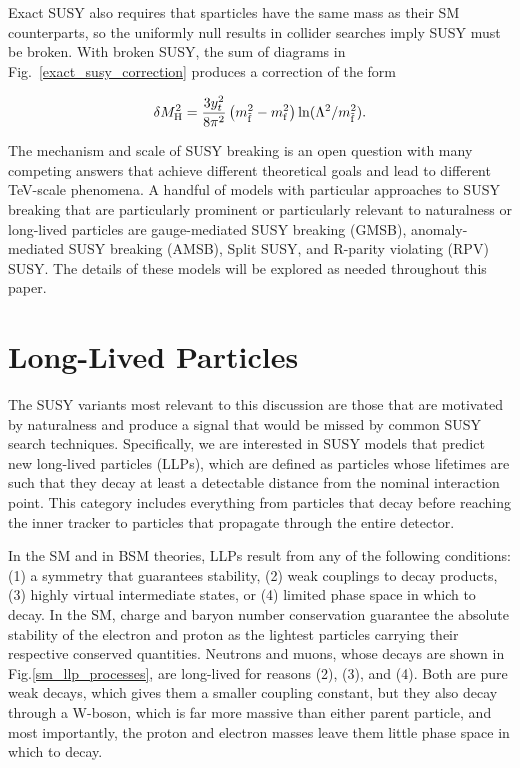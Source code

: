 \documentclass[12pt]{article}
\begin{document}
    Exact SUSY also requires that sparticles have the same mass as their SM counterparts, so the uniformly null results in collider searches imply SUSY must be broken. With broken SUSY, the sum of diagrams in Fig.~\ref{exact_susy_correction} produces a correction of the form~\cite{feng}

    \noindent \begin{equation}
        \delta M_{\mathrm{H}}^2 = \frac{3y_t^2}{8\pi^2}\left(m_{\tilde{\mathrm{f}}}^2 - m_{\mathrm{f}}^2 \right)\ln(\Lambda^2/m_{\tilde{\mathrm{f}}}^2).
    \label{higgs_susy_correction}
    \end{equation}
    
    The mechanism and scale of SUSY breaking is an open question with many competing answers that achieve different theoretical goals and lead to different TeV-scale phenomena. A handful of models with particular approaches to SUSY breaking that are particularly prominent or particularly relevant to naturalness or long-lived particles are gauge-mediated SUSY breaking (GMSB), anomaly-mediated SUSY breaking (AMSB), Split SUSY, and R-parity violating (RPV) SUSY. The details of these models will be explored as needed throughout this paper.

\section{Long-Lived Particles}
    The SUSY variants most relevant to this discussion are those that are motivated by naturalness and  produce a signal that would be missed by common SUSY search techniques. Specifically, we are interested in SUSY models that predict new long-lived particles (LLPs), which are defined as particles whose lifetimes are such that they decay at least a detectable distance from the nominal interaction point. This category includes everything from particles that decay before reaching the inner tracker to particles that propagate through the entire detector. 

    In the SM and in BSM theories, LLPs result from any of the following conditions: (1) a symmetry that guarantees stability, (2) weak couplings to decay products, (3) highly virtual intermediate states, or (4) limited phase space in which to decay. In the SM, charge and baryon number conservation guarantee the absolute stability of the electron and proton as the lightest particles carrying their respective conserved quantities. Neutrons and muons, whose decays are shown in Fig.\ref{sm_llp_processes}, are long-lived for reasons (2), (3), and (4). Both are pure weak decays, which gives them a smaller coupling constant, but they also decay through a W-boson, which is far more massive than either parent particle, and most importantly, the proton and electron masses leave them little phase space in which to decay.
\end{document}
